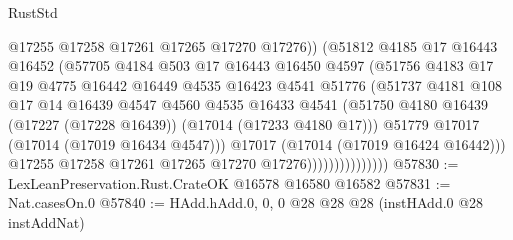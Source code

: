 \begin{lexlean}{RustStd}
\begin{coremodule}
{\begin{coremodule}
{{{{{{{{{{{{{{{{{{{{{{{{{{{{{{{{{{{{{{{{{{{{{{{{{{{{{{{                                  @17255
                                  @17258
                                  @17261
                                  @17265
                                  @17270
                                  @17276))
                              (@51812
                                @4185
                                @17
                                @16443
                                @16452
                                (@57705
                                  @4184
                                  @503
                                  @17
                                  @16443
                                  @16450
                                  @4597
                                  (@51756
                                    @4183
                                    @17
                                    @19
                                    @4775
                                    @16442
                                    @16449
                                    @4535
                                    @16423
                                    @4541
                                    @51776
                                    (@51737
                                      @4181
                                      @108
                                      @17
                                      @14
                                      @16439
                                      @4547
                                      @4560
                                      @4535
                                      @16433
                                      @4541
                                      (@51750
                                        @4180
                                        @16439
                                        (@17227 (@17228 @16439))
                                        (@17014 (@17233 @4180 @17)))
                                      @51779
                                      @17017
                                      (@17014 (@17019 @16434 @4547)))
                                    @17017
                                    (@17014 (@17019 @16424 @16442)))
                                  @17255
                                  @17258
                                  @17261
                                  @17265
                                  @17270
                                  @17276)))))))))))))))
@57830 := LexLeanPreservation.Rust.CrateOK @16578 @16580 @16582
@57831 := Nat.casesOn.{0}
@57840 := HAdd.hAdd.{0, 0, 0} @28 @28 @28 (instHAdd.{0} @28 instAddNat)
}}}}}}}}}}}}}}}}}}}}}}}}}}}}}}}}}}}}}}}}}}}}}}}}}}}}}}}
\end{coremodule}}
\end{coremodule}
\end{lexlean}
